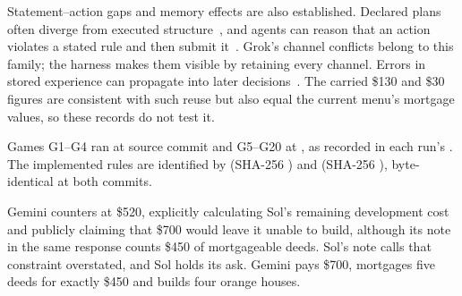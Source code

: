 Statement--action gaps and memory effects are also established. Declared plans often diverge from executed structure~\cite{oota2026declare}, and agents can reason that an action violates a stated rule and then submit it~\cite{co2026atomic}. Grok's channel conflicts belong to this family; the harness makes them visible by retaining every channel. Errors in stored experience can propagate into later decisions~\cite{xiong2026memory}. The carried \$130 and \$30 figures are consistent with such reuse but also equal the current menu's mortgage values, so these records do not test it.

Games G1--G4 ran at source commit  and G5--G20 at , as recorded in each run's . The implemented rules are identified by  (SHA-256 ) and  (SHA-256 ), byte-identical at both commits.

Gemini counters at \$520, explicitly calculating Sol's remaining development cost and publicly claiming that \$700 would leave it unable to build, although its note in the same response counts \$450 of mortgageable deeds. Sol's note calls that constraint overstated, and Sol holds its ask. Gemini pays \$700, mortgages five deeds for exactly \$450 and builds four orange houses.

